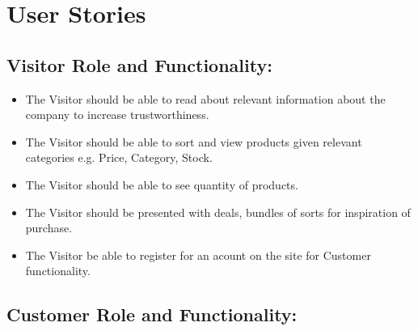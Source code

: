 \newpage

\section{User Stories}\label{app:user_stories}

\subsection{Visitor Role and Functionality:}

\begin{itemize}
    \item The Visitor should be able to read about relevant information
    about the company to increase trustworthiness.
    \item The Visitor should be able to sort and view  products given
    relevant categories e.g. Price, Category, Stock.
    \item The Visitor should be able to see quantity of products. 
    \item The Visitor should be presented with deals, bundles of sorts for
    inspiration of purchase.
    \item The Visitor be able to register for an acount on the site for Customer functionality.
\end{itemize}


\subsection{Customer Role and Functionality:}

